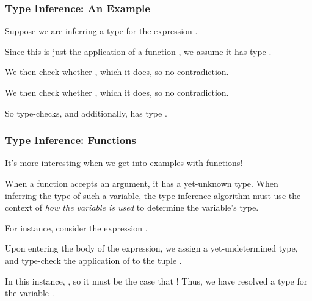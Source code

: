 \documentclass[aspectratio=169, handout]{beamer}
\begin{document}
\begin{frame}[fragile]
  \frametitle{Type Inference: An Example}

  Suppose we are inferring a type for the expression .

  \pause
  \vspace{\fill}

  Since this is just the application of a function ,
  we assume it has type .
  
  \pause
  \vspace{\fill}
  
  We then check whether , which it does, so no contradiction.
  
  \pause
  \vspace{\fill}
  
  We then check whether , which it does, so no contradiction.

  \pause
  \vspace{\fill}

  So  type-checks, and additionally, has type .
\end{frame}

\begin{frame}[fragile]
  \frametitle{Type Inference: Functions}

  It's more interesting when we get into examples with functions!

  \pause
  \vspace{\fill}

  When a function accepts an argument, it has a yet-unknown type. When
  inferring the type of such a variable, the type inference algorithm must
  use the context of \textit{how the variable is used} to determine the
  variable's type.

  \pause
  \vspace{\fill}

  For instance, consider the expression .

  \pause
  \vspace{\fill}

  Upon entering the body of the expression, we assign  a yet-undetermined
  type, and type-check the application of \code{+} to the tuple .

  \pause
  \vspace{\fill}

  In this instance, , so it must be the case that
  ! Thus, we have resolved a type for the variable .
\end{frame}
\end{document}
